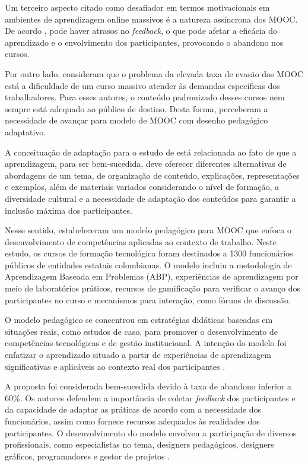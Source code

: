 \documentclass[portuguese]{textolivre}
\begin{document}
Um terceiro aspecto citado como desafiador em termos motivacionais em ambientes de aprendizagem online massivos é a natureza assíncrona dos MOOC.  De acordo \textcite{park_moocs_2021}, pode haver atrasos no \textit{feedback}, o que pode afetar a eficácia do aprendizado e o envolvimento dos participantes, provocando o abandono nos cursos. 

Por outro lado, \textcite{becerra_diseno_2020} consideram que o problema da elevada taxa de evasão dos MOOC está a dificuldade de um curso massivo atender às demandas específicas dos trabalhadores. Para esses autores, o conteúdo padronizado desses cursos nem sempre está adequado ao público de destino. Desta forma, perceberam a necessidade de avançar para modelo de MOOC com desenho pedagógico adaptativo.  

A conceituação de adaptação para o estudo de \textcite{becerra_diseno_2020} está relacionada ao fato de que a aprendizagem, para ser bem-sucedida, deve oferecer diferentes alternativas de abordagens de um tema, de organização de conteúdo, explicações, representações e exemplos, além de materiais variados considerando o nível de formação, a diversidade cultural e a necessidade de adaptação dos conteúdos para garantir a inclusão máxima dos participantes.

Nesse sentido, \textcite{becerra_diseno_2020} estabeleceram um modelo pedagógico para MOOC que enfoca o desenvolvimento de competências aplicadas ao contexto de trabalho. Neste estudo, os cursos de formação tecnológica foram destinados a 1300 funcionários públicos de entidades estatais colombianas. O modelo incluiu a metodologia de Aprendizagem Baseada em Problemas (ABP), experiências de aprendizagem por meio de laboratórios práticos, recursos de gamificação para verificar o avanço dos participantes no curso e mecanismos para interação, como fóruns de discussão. 

O modelo pedagógico se concentrou em estratégias didáticas baseadas em situações reais, como estudos de caso, para promover o desenvolvimento de competências tecnológicas e de gestão institucional. A intenção do modelo foi enfatizar o aprendizado situado a partir de experiências de aprendizagem significativas e aplicáveis ao contexto real dos participantes \cite{becerra_diseno_2020}.

A proposta foi considerada bem-sucedida devido à taxa de abandono inferior a 60\%. Os autores defendem a importância de coletar \textit{feedback} dos participantes e da capacidade de adaptar as práticas de acordo com a necessidade dos funcionários, assim como fornece recursos adequados às realidades dos participantes.  O desenvolvimento do modelo envolveu a participação de diversos profissionais, como especialistas no tema, designers pedagógicos, designers gráficos, programadores e gestor de projetos \cite{becerra_diseno_2020}.
\end{document}
